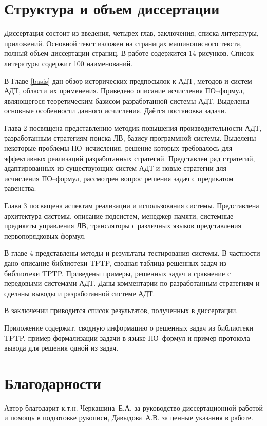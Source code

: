 \section*{Структура и объем диссертации}
Диссертация состоит из введения, четырех глав, заключения, списка литературы, приложений. Основной текст изложен на \pageref{pg:main} страницах машинописного текста, полный объем диссертации \pageref{pg:total} страниц. В работе содержится 14 рисунков. Список литературы содержит 100 наименований.

В Главе \ref{basis} дан обзор исторических предпосылок к АДТ, методов и систем АДТ, области их применения. Приведено описание исчисления ПО--формул, являющегося теоретическим базисом разработанной системы АДТ. Выделены основные особенности данного исчисления. Даётся постановка задачи.

Глава 2 посвящена представлению методик повышения производительности АДТ, разработанным стратегиям поиска ЛВ, базису программной системы. Выделены некоторые проблемы ПО--исчисления, решение которых требовалось для эффективных реализаций разработанных стратегий. Представлен ряд стратегий, адаптированных из существующих систем АДТ и новые стратегии для исчисления ПО--формул, рассмотрен вопрос решения задач с предикатом равенства.

Глава 3 посвящена аспектам реализации и использования системы. Представлена архитектура системы, описание подсистем, менеджер памяти, системные предикаты управления ЛВ, трансляторы с различных языков представления первопорядковых формул.

В главе 4 представлены методы и результаты тестирования системы. В частности дано описание библиотеки TPTP, сводная таблица решенных задач из библиотеки TPTP. Приведены примеры, решенных задач и сравнение с передовыми системами АДТ. Даны комментарии по разработанным стратегиям и сделаны выводы и разработанной системе АДТ. %

В заключении приводится список результатов, полученных в диссертации. %

Приложение содержит, сводную информацию о решенных задач из библиотеки TPTP, пример формализации задачи в языке ПО--формул и пример протокола вывода для решения одной из задач.



\section*{Благодарности}
Автор благодарит к.т.н. Черкашина~Е.А. за руководство диссертационной работой и помощь в подготовке рукописи, Давыдова~А.В. за ценные указания в работе.


